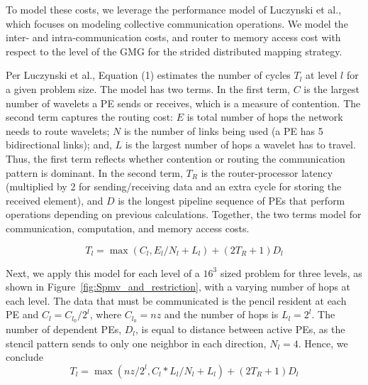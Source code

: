\documentclass[conference]{IEEEtran}
\begin{document}
            To model these costs, we leverage the performance model of Luczynski et al.\cite{luczynski_reduce}, which focuses on modeling collective communication operations. We model the inter- and intra-communication costs, and router to memory access cost with respect to the level of the GMG for the strided distributed mapping strategy.

            Per Luczynski et al., Equation (1) %
            estimates the number of cycles \(T_l\) at level \(l\) for a given problem size. The model has two terms. In the first term, \(C\) is the largest number of wavelets a PE sends or receives, which is a measure of contention. The second term captures the routing cost: \(E\) is total number of hops the network needs to route wavelets; \(N\) is the number of links being used (a PE has 5 bidirectional links); and, \(L\) is the largest number of hops a wavelet has to travel.  Thus, the first term reflects whether contention or routing the communication pattern is dominant. In the second term, \(T_R\) is the router-processor latency (multiplied by 2 for sending/receiving data and an extra cycle for storing the received element), and \(D\) is the longest pipeline sequence of PEs that perform operations depending on previous calculations.  Together, the two terms %
            model for communication, computation, and memory access costs.

            \begin{equation}\label{eq:comm_model}
                T_l = \max \left( C_l, E_l / N_l + L_l \right) + (2 T_R + 1) D_l
            \end{equation}

            Next, we apply this model for each level of a \(16^3\) sized problem for three levels, as shown in Figure~\ref{fig:Spmv_and_restriction}, with a varying number of hops at each level. The data that must be communicated is the pencil resident at each PE and \(C_l = C_{l_0}/2^l\), where \(C_{l_0}=nz\) and the number of hops %
            is \(L_l = 2^l\). The number of dependent PEs, \(D_l\), is equal to distance between active PEs, as the stencil pattern sends to only one neighbor in each direction, \(N_l = 4\). Hence, we conclude
            \begin{equation}
                T_l = \max \left( nz/2^l, C_l*L_l / N_l + L_l \right) + (2 T_R + 1) D_l
                \label{eq:comm_model_applied}
            \end{equation}
\end{document}
